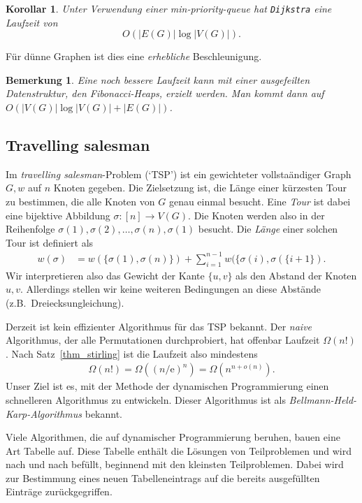\documentclass[10pt,reqno]{amsart}
\numberwithin{equation}{section}
\newtheorem{remark}[definition]{Bemerkung}
\newtheorem{corollary}[definition]{Korollar}
\newcommand\eul{\mathrm{e}}
\begin{document}
\begin{corollary}\label{cor_dijkstra}
	Unter Verwendung einer min-priority-queue hat {\tt Dijkstra} eine Laufzeit von $$O(|E(G)|\log|V(G)|).$$
\end{corollary}

\noindent
F\"ur d\"unne Graphen ist dies eine {\em erhebliche} Beschleunigung.

\begin{remark}\label{rem_fibonacci}\upshape
Eine noch bessere Laufzeit kann mit einer ausgefeilten Datenstruktur, den {\em Fibonacci-Heaps}, erzielt werden.
Man kommt dann auf $O(|V(G)|\log|V(G)|+|E(G)|)$.
\end{remark}

\subsection{Travelling salesman}\label{sec_tsp}
Im \emph{travelling salesman}-Problem (`TSP') ist ein gewichteter vollsta\"andiger Graph $G,w$ auf $n$ Knoten gegeben.
Die Zielsetzung ist, die L\"ange einer k\"urzesten Tour zu bestimmen, die alle Knoten von $G$ genau einmal besucht.
Eine {\em Tour} ist dabei eine bijektive Abbildung $\sigma:[n]\to V(G)$.
Die Knoten werden also in der Reihenfolge $\sigma(1),\sigma(2),\ldots,\sigma(n),\sigma(1)$ besucht.
Die {\em L\"ange} einer solchen Tour ist definiert als
	\begin{align*}
		w(\sigma)&=w(\{\sigma(1),\sigma(n)\})+\sum_{i=1}^{n-1}w(\{\sigma(i),\sigma(\{i+1\}).
	\end{align*}
Wir interpretieren also das Gewicht der Kante $\{u,v\}$ als den Abstand der Knoten $u,v$.
Allerdings stellen wir keine weiteren Bedingungen an diese Abst\"ande (z.B.\ Dreiecksungleichung).

Derzeit ist kein effizienter Algorithmus f\"ur das TSP bekannt.
Der {\em naive} Algorithmus, der alle Permutationen durchprobiert, hat offenbar Laufzeit $\Omega(n!)$.
Nach Satz~\ref{thm_stirling} ist die Laufzeit also mindestens
\begin{align}\label{eqtsp_naiv}
	\Omega(n!)=\Omega((n/\eul)^n)=\Omega(n^{n+o(n)}).
\end{align}
Unser Ziel ist es, mit der Methode der dynamischen Programmierung einen schnelleren Algorithmus zu entwickeln.
Dieser Algorithmus ist als {\em Bellmann-Held-Karp-Algorithmus} bekannt.

Viele Algorithmen, die auf dynamischer Programmierung beruhen, bauen eine Art Tabelle auf.
Diese Tabelle enth\"alt die L\"osungen von Teilproblemen und wird nach und nach bef\"ullt, beginnend mit den kleinsten Teilproblemen.
Dabei wird zur Bestimmung eines neuen Tabelleneintrags auf die bereits ausgef\"ullten Eintr\"age zur\"uckgegriffen.
\end{document}

